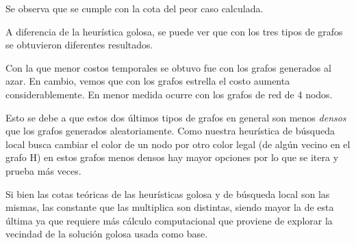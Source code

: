 \quad

\quad Se observa que se cumple con la cota del peor caso calculada.

\quad A diferencia de la heurística golosa, se puede ver que con los tres tipos de grafos se obtuvieron diferentes resultados.

\quad Con la que menor costos temporales se obtuvo fue con los grafos generados al azar. En cambio, vemos que con los grafos estrella el costo aumenta considerablemente. En menor medida ocurre con los grafos de red de 4 nodos. 

\quad Esto se debe a que estos dos últimos tipos de grafos en general son menos \textit{densos} que los grafos generados aleatoriamente. Como nuestra heurística de búsqueda local busca cambiar el color de un nodo por otro color legal (de algún vecino en el grafo H) en estos grafos menos densos hay mayor opciones por lo que se itera y prueba más veces.

\quad Si bien las cotas teóricas de las heurísticas golosa y de búsqueda local son las mismas, las constante que las multiplica son distintas, siendo mayor la de esta última ya que requiere más cálculo computacional que proviene de explorar la vecindad de la solución golosa usada como base.